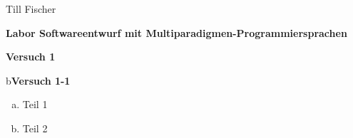 \documentclass[german,10pt,oneside, fleqn, a4paper]{article}
\begin{document}
Till Fischer\\

    
\vspace{1cm}

\begin{center}
{\bf \Large Labor Softwareentwurf mit Multiparadigmen-Programmiersprachen} \\[2ex]
\end{center}
\begin{center}
{\bf \Large Versuch 1} \\[2ex]
\end{center}
\vspace{2cm}

b{\bf Versuch 1-1} \\[2ex]
\begin{enumerate}[a)]
\item Teil 1
\item Teil 2
\end{enumerate}
\end{document}
